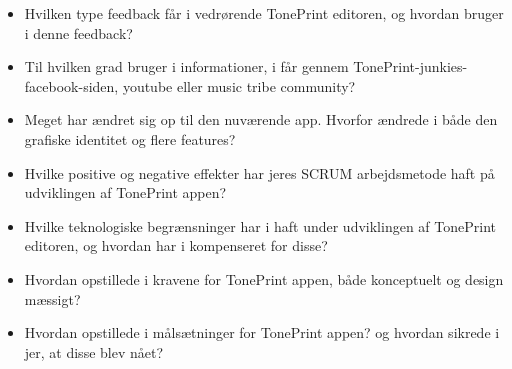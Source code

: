 \begin{itemize}
  \item Hvilken type feedback får i vedrørende TonePrint editoren, og hvordan bruger i denne feedback?\\
  \item Til hvilken grad bruger i informationer, i får gennem TonePrint-junkies-facebook-siden, youtube eller music tribe community?\\ 
  \item Meget har ændret sig op til den nuværende app. Hvorfor ændrede i både den grafiske identitet og flere features?\\
  \item Hvilke positive og negative effekter har jeres SCRUM arbejdsmetode haft på udviklingen af TonePrint appen?\\
  \item Hvilke teknologiske begrænsninger har i haft under udviklingen af TonePrint editoren, og hvordan har i kompenseret for disse?\\
  \item Hvordan opstillede i kravene for TonePrint appen, både konceptuelt og design mæssigt?\\
  \item Hvordan opstillede i målsætninger for TonePrint appen? og hvordan sikrede i jer, at disse blev nået?\\
\end{itemize}

